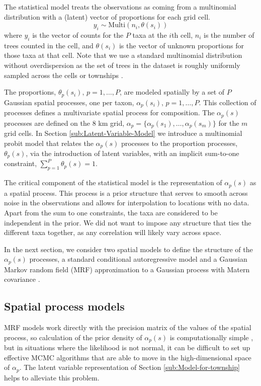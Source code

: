 \documentclass[12pt]{article}\usepackage[]{graphicx}\usepackage[]{color}
\begin{document}
The statistical model treats the observations as coming from a multinomial
distribution with a (latent) vector of proportions for each grid cell.
\[
y_{i}\sim\mbox{Multi}(n_{i},\theta(s_{i}))
\]
where $y_{i}$ is the vector of counts for the $P$ taxa at the $i$th
cell, $n_{i}$ is the number of trees counted in the cell, and $\theta(s_{i})$
is the vector of unknown proportions for those taxa at that cell.
Note that we use a standard multinomial distribution without overdispersion
as the set of trees in the dataset is roughly uniformly sampled across
the cells or townships \citep{Gori:etal:2015}.

The proportions, $\theta_{p}(s_{i}),\, p=1,\ldots,P$, are modeled
spatially by a set of $P$ Gaussian spatial processes, one per taxon,
$\alpha_{p}(s_{i}),\, p=1,\ldots,P$. This collection of processes
defines a multivariate spatial process for composition. The $\alpha_{p}(s)$
processes are defined on the 8 km grid, $\alpha_{p}=\{\alpha_{p}(s_{1}),\ldots,\alpha_{p}(s_{m})\}$
for the $m$ grid cells. In Section \ref{sub:Latent-Variable-Model}
we introduce a multinomial probit model that relates the $\alpha_{p}(s)$
processes to the proportion processes, $\theta_{p}(s)$, via the introduction
of latent variables, with an implicit sum-to-one constraint, $\sum_{p=1}^{P}\theta_{p}(s)=1$.



The critical component of the statistical model is the representation
of $\alpha_{p}(s)$ as a spatial process. This process is a prior
structure that serves to smooth across noise in the observations and
allows for interpolation to locations with no data. Apart from the
sum to one constraints, the taxa are considered to be independent
in the prior. We did not want to impose any structure that ties the
different taxa together, as any correlation will likely vary across
space.

In the next section, we consider two spatial models to define the
structure of the $\alpha_{p}(s)$ processes, a standard conditional
autoregressive model \citep{Bane:etal:2003} and a Gaussian Markov
random field (MRF) approximation to a Gaussian process with Matern
covariance \citep{Lind:etal:2011}. 


\subsection{Spatial process models}

MRF models work directly with the precision matrix of the values of
the spatial process, so calculation of the prior density of $\alpha_{p}(s)$
is computationally simple \citep{Rue:Held:2005}, but in situations
where the likelihood is not normal, it can be difficult to set up
effective MCMC algorithms that are able to move in the high-dimensional
space of $\alpha_{p}$. The latent variable representation of Section
\ref{sub:Model-for-township} helps to alleviate this problem.
\end{document}
